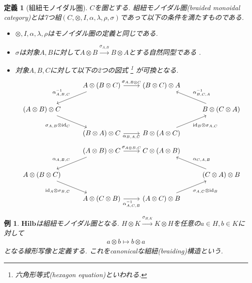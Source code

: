 \documentclass[a4paper,12pt]{ltjsarticle}
\theoremstyle{break}
\newtheorem{defn}[thm]{定義}
\newtheorem{eg}[thm]{例}
\newcommand{\hilb}{\mathbf{Hilb}}
\newcommand{\xr}[1]{\xrightarrow{#1}}
\newcommand{\id}{\mathrm{id}}
\newcommand{\al}{\alpha}
\newcommand{\la}{\lambda}
\newcommand{\si}{\sigma}
\newcommand{\mt}{\mapsto}
\newcommand{\ot}{\otimes}
\numberwithin{equation}{section}
\begin{document}
\begin{defn}[組紐モノイダル圏]
  $C$を圏とする. 組紐モノイダル圏(braided monoidal category)とは7つ組$(C,\ot,I,\al,\la,\rho,\si)$であって以下の条件を満たすものである. 
  \begin{itemize}
    \item $\ot,I,\al,\la,\rho$はモノイダル圏の定義と同じである. 
    \item $\si$は対象$A,B$に対して$A \ot B \xr{\si_{A,B}} B \ot A$とする自然同型である . 
    \item 対象$A,B,C$に対して以下の2つの図式
    \footnote{
      六角形等式(hexagon equation)といわれる. 
    }
    が可換となる.
    \[\begin{tikzcd}
      & {A \ot (B \ot C)} & {(B \ot C)\ot A} \\
      {(A \ot B) \ot C} &&& {B \ot (C \ot A)} \\
      & {(B \ot A) \ot C} & {B \ot (A \ot C)}
      \arrow["{\al_{A,B,C}^{-1}}"', from=1-2, to=2-1]
      \arrow["{\si_{A,B \ot C}}", from=1-2, to=1-3]
      \arrow["{\al_{B,C,A}^{-1}}"', from=2-4, to=1-3]
      \arrow["{\id_{B} \ot \si_{A,C}}"', from=3-3, to=2-4]
      \arrow["{\si_{A,B} \ot \id_C}"', from=2-1, to=3-2]
      \arrow["{\al_{B,A,C}}"', from=3-2, to=3-3]
    \end{tikzcd}\]
    \[\begin{tikzcd}
      & {(A \ot B) \ot C} & {C \ot (A \ot B)} \\
      {A \ot (B \ot C)} &&& {(C \ot A) \ot B} \\
      & {A \ot (C \ot B)} & {(A \ot C) \ot B}
      \arrow["{\al_{A,B,C}}"', from=1-2, to=2-1]
      \arrow["{\si_{A \ot B, C}}", from=1-2, to=1-3]
      \arrow["{\al_{C,A,B}}"', from=2-4, to=1-3]
      \arrow["{\si_{A,C} \ot \id_B}"', from=3-3, to=2-4]
      \arrow["{\id_A \ot \si_{B,C}}"', from=2-1, to=3-2]
      \arrow["{\al_{A,C,B}^{-1}}"', from=3-2, to=3-3]
    \end{tikzcd}\]
  \end{itemize}
\end{defn}   

\begin{eg}
  $\hilb$は組紐モノイダル圏となる. 
  $H \ot K \xr{\si_{H,K}} K \ot H$を任意の$a \in H, b \in K$に対して
  \begin{align*}
    a \ot b \mt b \ot a
  \end{align*}
  となる線形写像と定義する.  
  これをcanonicalな組紐(braiding)構造という. 
\end{eg}
\end{document}
